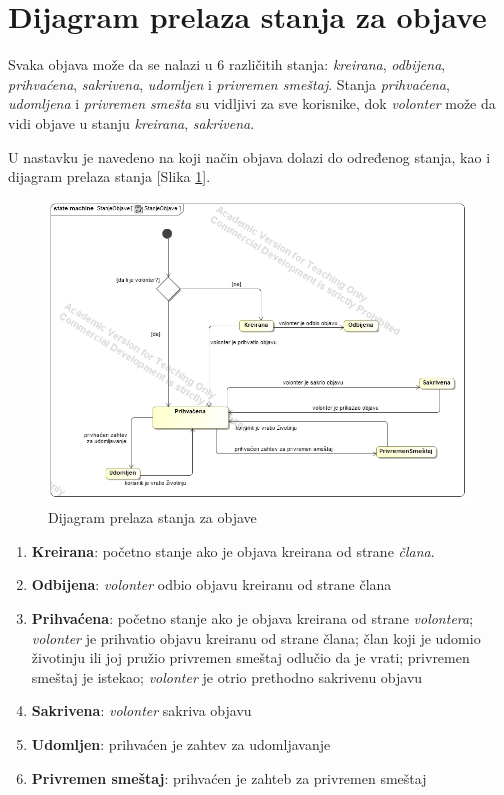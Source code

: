 \section{Dijagram prelaza stanja za objave}
\par Svaka objava može da se nalazi u 6 različitih stanja: \textit{kreirana}, \textit{odbijena},
\textit{prihvaćena}, \textit{sakrivena}, \textit{udomljen} i \textit{privremen smeštaj}. 
Stanja \textit{prihvaćena}, \textit{udomljena} i \textit{privremen smešta} su vidljivi za sve korisnike,
dok \textit{volonter} može da vidi objave u stanju \textit{kreirana}, \textit{sakrivena}.
\par U nastavku je navedeno na koji način objava dolazi do određenog stanja, kao i dijagram prelaza stanja [Slika \ref{fig:state}].
\begin{figure}[h]
    \centering
    \includegraphics[width=\textwidth]{img/state.jpg}
    \caption{Dijagram prelaza stanja za objave}
    \label{fig:state}
\end{figure}
\begin{enumerate}
    \item \textbf{Kreirana}: početno stanje ako je objava kreirana od strane \textit{člana}.
    \item \textbf{Odbijena}: \textit{volonter} odbio objavu kreiranu od strane člana
    \item \textbf{Prihvaćena}: 
        početno stanje ako je objava kreirana od strane \textit{volontera}; 
        \textit{volonter} je prihvatio objavu kreiranu od strane člana;
        član koji je udomio životinju ili joj pružio privremen smeštaj odlučio da je vrati;
        privremen smeštaj je istekao;
        \textit{volonter} je otrio prethodno sakrivenu objavu
    \item \textbf{Sakrivena}: \textit{volonter} sakriva objavu
    \item \textbf{Udomljen}: prihvaćen je zahtev za udomljavanje
    \item \textbf{Privremen smeštaj}: prihvaćen je zahteb za privremen smeštaj
\end{enumerate}
